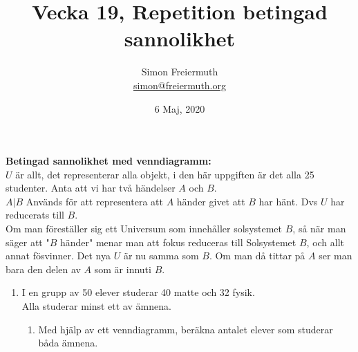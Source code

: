 \documentclass[12pt, letterpaper, twoside]{article}
\title{Vecka 19, Repetition betingad sannolikhet}
\author{Simon Freiermuth \\ \href{mailto:simon@freiermuth.org}{simon@freiermuth.org}}
\date{6 Maj, 2020}
\begin{document}
\maketitle

\begin{flushleft}
\large\textbf{Betingad sannolikhet med venndiagramm:}\\
$ U $ är allt, det representerar alla objekt, i den här uppgiften är det alla 25 studenter.
Anta att vi har två händelser $ A $ och $ B $.\\
$ A|B $ Används för att representera att $ A $ händer givet att $ B $ har hänt. Dvs $ U $
har reducerats till $ B $.\\
Om man föreställer sig ett Universum som innehåller solsystemet $ B $, så när man säger att
"$ B $ händer" menar man att fokus reduceras till Solsystemet $ B $, och allt annat fösvinner.
Det nya $ U $ är nu samma som $ B $. Om man då tittar på $ A $ ser man bara den delen av $ A $
som är innuti $ B $.

\hfill




\hfill

\begin{enumerate}[label=\textbf{\arabic* .}]
    \item
    I en grupp av 50 elever studerar 40 matte och 32 fysik.\\
    Alla studerar minst ett av ämnena.
    \begin{enumerate}[label=\textbf{\alph*)}]
        \item
        Med hjälp av ett venndiagramm, beräkna antalet elever som studerar båda ämnena.


\end{enumerate}
\end{enumerate}
\end{flushleft}
\end{document}
